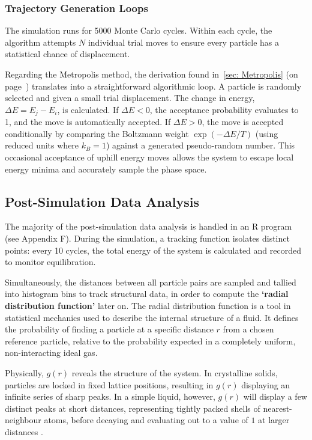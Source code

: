 \documentclass[11pt,a4paper]{article}
\begin{document}
        \subsubsection{Trajectory Generation Loops}
            The simulation runs for 5000 Monte Carlo cycles.
            Within each cycle, the algorithm attempts $N$ individual trial moves to ensure every particle has a statistical chance of displacement.

            Regarding the Metropolis method, the derivation found in~\ref{sec: Metropolis} (on page~\pageref{sec: Metropolis}) translates into a straightforward algorithmic loop.
            A particle is randomly selected and given a small trial displacement.
            The change in energy, $\Delta E = E_j - E_i$, is calculated.
            If $\Delta E < 0$, the acceptance probability evaluates to 1, and the move is automatically accepted.
            If $\Delta E > 0$, the move is accepted conditionally by comparing the Boltzmann weight $\exp(-\Delta E / T)$ (using reduced units where $k_B = 1$) against a generated pseudo-random number.
            This occasional acceptance of uphill energy moves allows the system to escape local energy minima and accurately sample the phase space.
        
    \newpage
    \subsection{Post-Simulation Data Analysis}
        The majority of the post-simulation data analysis is handled in an R program (see Appendix F). 
        During the simulation, a tracking function isolates distinct points: every 10 cycles, the total energy of the system is calculated and recorded to monitor equilibration.
        
        Simultaneously, the distances between all particle pairs are sampled and tallied into histogram bins to track structural data, in order to compute the \textbf{`radial distribution function'} later on.
        The radial distribution function is a tool in statistical mechanics used to describe the internal structure of a fluid.
        It defines the probability of finding a particle at a specific distance $r$ from a chosen reference particle, relative to the probability expected in a completely uniform, non-interacting ideal gas. 
        
        Physically, $g(r)$ reveals the structure of the system.
        In crystalline solids, particles are locked in fixed lattice positions, resulting in $g(r)$ displaying an infinite series of sharp peaks.
        In a simple liquid, however, $g(r)$ will display a few distinct peaks at short distances, representing tightly packed shells of nearest-neighbour atoms, before decaying and evaluating out to a value of $1$ at larger distances \citep{RadialDistributionFunction21}.
        
\end{document}
